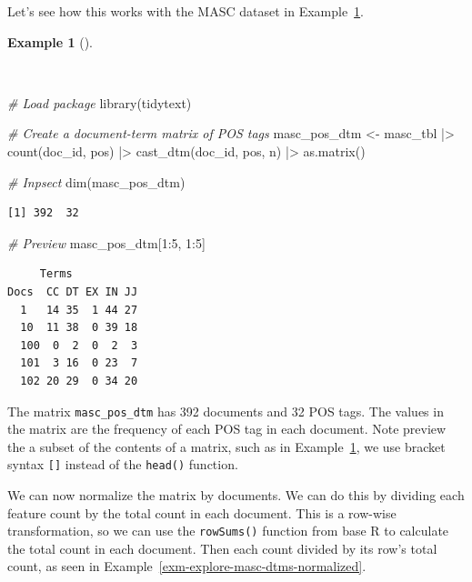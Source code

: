 \documentclass[
  letterpaper,
]{book}
\newenvironment{Shaded}{\begin{snugshade}}{\end{snugshade}}
\newcommand{\CommentTok}[1]{\textcolor[rgb]{0.00,0.00,0.00}{\textit{#1}}}
\newcommand{\DecValTok}[1]{\textcolor[rgb]{0.00,0.00,0.00}{#1}}
\newcommand{\FunctionTok}[1]{\textcolor[rgb]{0.00,0.00,0.00}{#1}}
\newcommand{\NormalTok}[1]{\textcolor[rgb]{0.00,0.00,0.00}{#1}}
\newcommand{\OtherTok}[1]{\textcolor[rgb]{0.00,0.00,0.00}{#1}}
\newcommand{\SpecialCharTok}[1]{\textcolor[rgb]{0.00,0.00,0.00}{#1}}
\theoremstyle{definition}
\newtheorem{example}{Example}[chapter]
\theoremstyle{remark}
\begin{document}
Let's see how this works with the MASC dataset in
Example~\ref{exm-explore-masc-dtms}.

\begin{example}[]\protect\hypertarget{exm-explore-masc-dtms}{}\label{exm-explore-masc-dtms}

~

\begin{Shaded}
\begin{Highlighting}[]
\CommentTok{\# Load package}
\FunctionTok{library}\NormalTok{(tidytext)}

\CommentTok{\# Create a document{-}term matrix of POS tags}
\NormalTok{masc\_pos\_dtm }\OtherTok{\textless{}{-}}
\NormalTok{  masc\_tbl }\SpecialCharTok{|\textgreater{}}
  \FunctionTok{count}\NormalTok{(doc\_id, pos) }\SpecialCharTok{|\textgreater{}}
  \FunctionTok{cast\_dtm}\NormalTok{(doc\_id, pos, n) }\SpecialCharTok{|\textgreater{}}
  \FunctionTok{as.matrix}\NormalTok{()}

\CommentTok{\# Inpsect}
\FunctionTok{dim}\NormalTok{(masc\_pos\_dtm)}
\end{Highlighting}
\end{Shaded}

\begin{verbatim}
[1] 392  32
\end{verbatim}

\begin{Shaded}
\begin{Highlighting}[]
\CommentTok{\# Preview}
\NormalTok{masc\_pos\_dtm[}\DecValTok{1}\SpecialCharTok{:}\DecValTok{5}\NormalTok{, }\DecValTok{1}\SpecialCharTok{:}\DecValTok{5}\NormalTok{]}
\end{Highlighting}
\end{Shaded}

\begin{verbatim}
     Terms
Docs  CC DT EX IN JJ
  1   14 35  1 44 27
  10  11 38  0 39 18
  100  0  2  0  2  3
  101  3 16  0 23  7
  102 20 29  0 34 20
\end{verbatim}

\end{example}

The matrix \texttt{masc\_pos\_dtm} has 392 documents and 32 POS tags.
The values in the matrix are the frequency of each POS tag in each
document. Note preview the a subset of the contents of a matrix, such as
in Example~\ref{exm-explore-masc-dtms}, we use bracket syntax
\texttt{{[}{]}} instead of the \texttt{head()} function.

We can now normalize the matrix by documents. We can do this by dividing
each feature count by the total count in each document. This is a
row-wise transformation, so we can use the \texttt{rowSums()} function
from base R to calculate the total count in each document. Then each
count divided by its row's total count, as seen in
Example~\ref{exm-explore-masc-dtms-normalized}.
\end{document}
